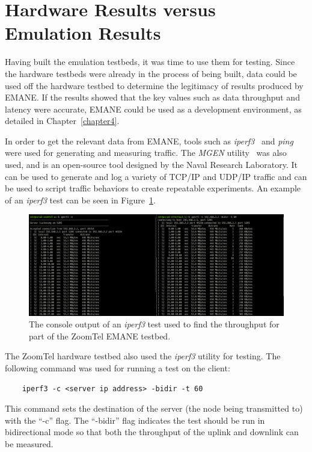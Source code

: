 \section{Hardware Results versus Emulation Results}
Having built the emulation testbeds, it was time to use them for testing.
Since the hardware testbeds were already in the process of being built, data could be used off the hardware testbed to determine the legitimacy of results produced by EMANE.
If the results showed that the key values such as data throughput and latency were accurate, EMANE could be used as a development environment, as detailed in Chapter~\ref{chapter4}.\par
In order to get the relevant data from EMANE, tools such as \textit{iperf3}~\cite{iperf} and \textit{ping}~\cite{ping} were used for generating and measuring traffic.
The \textit{MGEN} utility~\cite{mgen} was also used, and is an open-source tool designed by the Naval Research Laboratory.
It can be used to generate and log a variety of TCP/IP and UDP/IP traffic and can be used to script traffic behaviors to create repeatable experiments.
An example of an \textit{iperf3} test can be seen in Figure~\ref{iperf_test}.
\begin{figure}[!ht]
    \centering
    \includegraphics[width=\textwidth,keepaspectratio]{Images/Chpt3/ThroughputTest.png}
    \caption{The console output of an \textit{iperf3} test used to find the throughput for part of the ZoomTel EMANE testbed.}
    \label{iperf_test}
\end{figure}
The ZoomTel hardware testbed also used the \textit{iperf3} utility for testing.
The following command was used for running a test on the client:
\begin{verbatim}
    iperf3 -c <server ip address> -bidir -t 60
\end{verbatim}
This command sets the destination of the server (the node being transmitted to) with the ``-c'' flag.
The ``-bidir'' flag indicates the test should be run in bidirectional mode so that both the throughput of the uplink and downlink can be measured.
